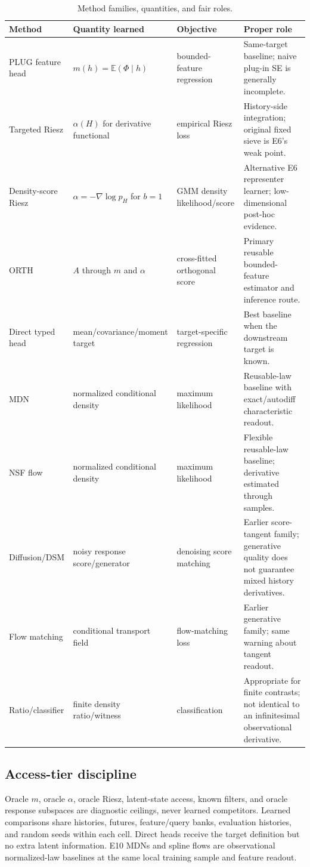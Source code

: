\documentclass[10.5pt]{article}
\newcommand{\E}{\mathbb{E}}
\begin{document}
\begin{table}[t]
\centering
\footnotesize
\renewcommand{\arraystretch}{1.12}
\caption{Method families, quantities, and fair roles.}
\begin{tabularx}{\textwidth}{@{}p{2.7cm}p{3.15cm}p{2.4cm}Y@{}}
\toprule
Method & Quantity learned & Objective & Proper role \\
\midrule
PLUG feature head & $m(h)=\E(\Phi\mid h)$ & bounded-feature regression & Same-target baseline; naive plug-in SE is generally incomplete. \\
Targeted Riesz & $\alpha(H)$ for derivative functional & empirical Riesz loss & History-side integration; original fixed sieve is E6's weak point. \\
Density-score Riesz & $\alpha=-\nabla\log p_H$ for $b=1$ & GMM density likelihood/score & Alternative E6 representer learner; low-dimensional post-hoc evidence. \\
ORTH & $A$ through $m$ and $\alpha$ & cross-fitted orthogonal score & Primary reusable bounded-feature estimator and inference route. \\
Direct typed head & mean/covariance/moment target & target-specific regression & Best baseline when the downstream target is known. \\
MDN & normalized conditional density & maximum likelihood & Reusable-law baseline with exact/autodiff characteristic readout. \\
NSF flow & normalized conditional density & maximum likelihood & Flexible reusable-law baseline; derivative estimated through samples. \\
Diffusion/DSM & noisy response score/generator & denoising score matching & Earlier score-tangent family; generative quality does not guarantee mixed history derivatives. \\
Flow matching & conditional transport field & flow-matching loss & Earlier generative family; same warning about tangent readout. \\
Ratio/classifier & finite density ratio/witness & classification & Appropriate for finite contrasts; not identical to an infinitesimal observational derivative. \\
\bottomrule
\end{tabularx}
\end{table}

\subsection{Access-tier discipline}
Oracle $m$, oracle $\alpha$, oracle Riesz, latent-state access, known filters, and oracle response subspaces are diagnostic ceilings, never learned competitors.  Learned comparisons share histories, futures, feature/query banks, evaluation histories, and random seeds within each cell.  Direct heads receive the target definition but no extra latent information.  E10 MDNs and spline flows are observational normalized-law baselines at the same local training sample and feature readout.
\end{document}
